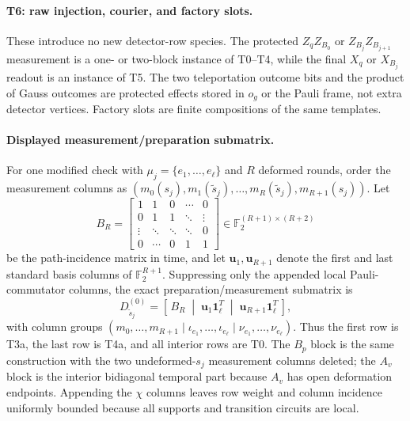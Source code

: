 \documentclass[aps,prx,reprint,superscriptaddress,nofootinbib,floatfix,longbibliography]{revtex4-2}
\theoremstyle{definition}
\begin{document}
\paragraph{T6: raw injection, courier, and factory slots.}
These introduce no new detector-row species.  The protected
$Z_qZ_{B_0}$ or $Z_{B_j}Z_{B_{j+1}}$ measurement is a one- or two-block
instance of T0--T4, while the final $X_q$ or $X_{B_j}$ readout is an instance
of T5.  The two teleportation outcome bits and the product of Gauss outcomes
are protected effects stored in $o_g$ or the Pauli frame, not extra detector
vertices.  Factory slots are finite compositions of the same templates.

\paragraph{Displayed measurement/preparation submatrix.}
For one modified check with $\mu_j=\{e_1,\ldots,e_\ell\}$ and $R$ deformed
rounds, order the measurement columns as
$(m_0(s_j),m_1(\widetilde s_j),\ldots,m_R(\widetilde s_j),m_{R+1}(s_j))$.
Let
\begin{equation}
 B_R=
 \begin{bmatrix}
 1&1&0&\cdots&0\\
 0&1&1&\ddots&\vdots\\
 \vdots&\ddots&\ddots&\ddots&0\\
 0&\cdots&0&1&1
 \end{bmatrix}
 \in\mathbb F_2^{(R+1)\times(R+2)}
 \tag{T7a}
\end{equation}
be the path-incidence matrix in time, and let $\mathbf u_1,\mathbf u_{R+1}$ denote the first
and last standard basis columns of $\mathbb F_2^{R+1}$.  Suppressing only the
appended local Pauli-commutator columns, the exact preparation/measurement
submatrix is
\begin{equation}
 D_{\widetilde s_j}^{(0)}=
 \left[\,B_R\;\middle|\;\mathbf u_1\mathbf1_\ell^T\;\middle|\;
 \mathbf u_{R+1}\mathbf1_\ell^T\,\right],
 \tag{T7b}
\end{equation}
with column groups $(m_0,\ldots,m_{R+1}\mid
\iota_{e_1},\ldots,\iota_{e_\ell}\mid
\nu_{e_1},\ldots,\nu_{e_\ell})$.  Thus the first row is T3a, the last row is
T4a, and all interior rows are T0.  The $B_p$ block is the same construction
with the two undeformed-$s_j$ measurement columns deleted; the $A_v$ block is
the interior bidiagonal temporal part because $A_v$ has open deformation
endpoints.  Appending the $\chi$ columns leaves row weight and column incidence
uniformly bounded because all supports and transition circuits are local.
\end{document}
